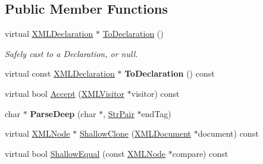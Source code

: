 \subsection*{Public Member Functions}
\begin{DoxyCompactItemize}
\item 
\hypertarget{classtinyxml2_1_1_x_m_l_declaration_a159d8ac45865215e88059ea1e5b52fc5}{}virtual \hyperlink{classtinyxml2_1_1_x_m_l_declaration}{X\+M\+L\+Declaration} $\ast$ \hyperlink{classtinyxml2_1_1_x_m_l_declaration_a159d8ac45865215e88059ea1e5b52fc5}{To\+Declaration} ()\label{classtinyxml2_1_1_x_m_l_declaration_a159d8ac45865215e88059ea1e5b52fc5}

\begin{DoxyCompactList}\small\item\em Safely cast to a Declaration, or null. \end{DoxyCompactList}\item 
\hypertarget{classtinyxml2_1_1_x_m_l_declaration_af724607a5fa810496fd6a21f5975a643}{}virtual const \hyperlink{classtinyxml2_1_1_x_m_l_declaration}{X\+M\+L\+Declaration} $\ast$ {\bfseries To\+Declaration} () const \label{classtinyxml2_1_1_x_m_l_declaration_af724607a5fa810496fd6a21f5975a643}

\item 
virtual bool \hyperlink{classtinyxml2_1_1_x_m_l_declaration_a953a7359cc312d15218eb5843a4ca108}{Accept} (\hyperlink{classtinyxml2_1_1_x_m_l_visitor}{X\+M\+L\+Visitor} $\ast$visitor) const 
\item 
\hypertarget{classtinyxml2_1_1_x_m_l_declaration_a19e33e0a9f9500f449261558c36f9a44}{}char $\ast$ {\bfseries Parse\+Deep} (char $\ast$, \hyperlink{classtinyxml2_1_1_str_pair}{Str\+Pair} $\ast$end\+Tag)\label{classtinyxml2_1_1_x_m_l_declaration_a19e33e0a9f9500f449261558c36f9a44}

\item 
virtual \hyperlink{classtinyxml2_1_1_x_m_l_node}{X\+M\+L\+Node} $\ast$ \hyperlink{classtinyxml2_1_1_x_m_l_declaration_a39458732ee6796cfc85dd35d3c488e0b}{Shallow\+Clone} (\hyperlink{classtinyxml2_1_1_x_m_l_document}{X\+M\+L\+Document} $\ast$document) const 
\item 
virtual bool \hyperlink{classtinyxml2_1_1_x_m_l_declaration_ace0d2d9bc1b63278bd5e984ebe0c7bd0}{Shallow\+Equal} (const \hyperlink{classtinyxml2_1_1_x_m_l_node}{X\+M\+L\+Node} $\ast$compare) const 
\end{DoxyCompactItemize}
